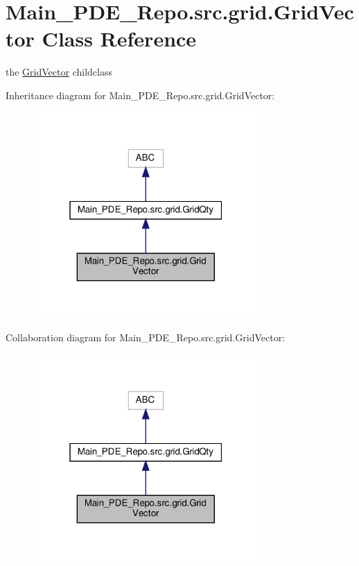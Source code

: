 \hypertarget{classMain__PDE__Repo_1_1src_1_1grid_1_1GridVector}{}\section{Main\+\_\+\+P\+D\+E\+\_\+\+Repo.\+src.\+grid.\+Grid\+Vector Class Reference}
\label{classMain__PDE__Repo_1_1src_1_1grid_1_1GridVector}


the \hyperlink{classMain__PDE__Repo_1_1src_1_1grid_1_1GridVector}{Grid\+Vector} childclass  




Inheritance diagram for Main\+\_\+\+P\+D\+E\+\_\+\+Repo.\+src.\+grid.\+Grid\+Vector\+:
\nopagebreak
\begin{figure}[H]
\begin{center}
\leavevmode
\includegraphics[width=244pt]{classMain__PDE__Repo_1_1src_1_1grid_1_1GridVector__inherit__graph}
\end{center}
\end{figure}


Collaboration diagram for Main\+\_\+\+P\+D\+E\+\_\+\+Repo.\+src.\+grid.\+Grid\+Vector\+:
\nopagebreak
\begin{figure}[H]
\begin{center}
\leavevmode
\includegraphics[width=244pt]{classMain__PDE__Repo_1_1src_1_1grid_1_1GridVector__coll__graph}
\end{center}
\end{figure}
